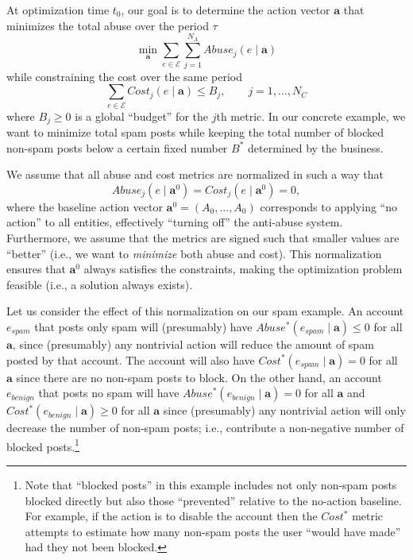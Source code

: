 At optimization time $t_0$, our goal is to determine the action vector $\mathbf{a}$ that minimizes the total abuse over the period $\tau$
\begin{equation}\label{eq:objective} 
\min_\mathbf{a} \sum_{e \in \mathcal{E}} \sum_{j=1}^{N_A} Abuse_{j}(e \mid \mathbf{a})
\end{equation}
while constraining the cost over the same period
\begin{equation}
	\label{eq:constraints}
	\sum_{e \in \mathcal{E}} Cost_{j}(e \mid \mathbf{a}) \leq B_{j}, \qquad j = 1, \ldots, N_C
\end{equation}
where $B_j \geq 0$ is a global ``budget'' for the $j$th metric. In our concrete example, we want to minimize total spam posts while keeping the total number of blocked non-spam posts below a certain fixed number $B^*$ determined by the business.

We assume that all abuse and cost metrics are normalized in such a way that 
\begin{equation}
    \label{eq:normalization}
Abuse_{j}(e \mid \mathbf{a}^0) = Cost_{j}(e \mid \mathbf{a}^0) = 0,
\end{equation}
where the baseline action vector $\mathbf{a}^0 = \left(A_0, \ldots, A_0\right)$ corresponds to applying ``no action'' to all entities, effectively ``turning off'' the anti-abuse system. Furthermore, we assume that the metrics are signed such that smaller values are ``better'' (i.e., we want to {\em minimize} both abuse and cost). This normalization ensures that $\mathbf{a}^0$ always satisfies the constraints, making the optimization problem feasible (i.e., a solution always exists). 

Let us consider the effect of this normalization on our spam example. An account $e_{spam}$ that posts only spam will (presumably) have 
$Abuse^*(e_{spam} \mid \mathbf{a}) \le 0$
for all $\mathbf{a}$, since (presumably) any nontrivial action will reduce the amount of spam posted by that account. The account will also have $Cost^*(e_{spam} \mid \mathbf{a}) = 0$ for all $\mathbf{a}$ since there are no non-spam posts to block. On the other hand, an account $e_{benign}$ that posts no spam will have $Abuse^*(e_{benign} \mid \mathbf{a}) = 0$ for all $\mathbf{a}$ and 
$Cost^*(e_{benign} \mid \mathbf{a}) \ge 0 $
for all $\mathbf{a}$ since (presumably) any nontrivial action will only decrease the number of non-spam posts; i.e., contribute a non-negative number of blocked posts.\footnote{Note that ``blocked posts'' in this example includes not only non-spam posts blocked directly but also those ``prevented'' relative to the no-action baseline. For example, if the action is to disable the account then the $Cost^*$ metric attempts to estimate how many non-spam posts the user ``would have made'' had they not been blocked.}


